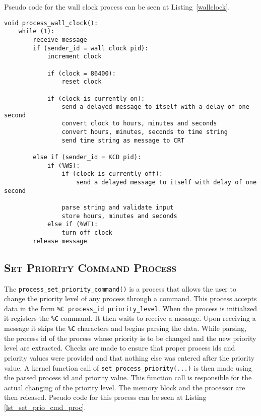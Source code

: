 \documentclass[oneside]{report}
\begin{document}
Pseudo code for the wall clock process can be seen at
Listing~\ref{wallclock}.

\begin{lstlisting}
void process_wall_clock():
    while (1):
        receive message
        if (sender_id = wall clock pid):
            increment clock

            if (clock = 86400):
                reset clock

            if (clock is currently on):
                send a delayed message to itself with a delay of one second
                convert clock to hours, minutes and seconds
                convert hours, minutes, seconds to time string
                send time string as message to CRT

        else if (sender_id = KCD pid):
            if (%WS):
                if (clock is currently off):
                    send a delayed message to itself with delay of one second

                parse string and validate input
                store hours, minutes and seconds
            else if (%WT):
                turn off clock
        release message
\end{lstlisting}

\subsection{\textsc{Set Priority Command Process}}
The \texttt{process\_set\_priority\_command()} is a process that
allows the user to change the priority level of any process through a
command. This process accepts data in the form \texttt{\%C process\_id 
priority\_level}. When the process is initialized it registers the
\texttt{\%C} command. It then waits to receive a message.  Upon receiving a
message it skips the \texttt{\%C} characters and begins parsing the
data. While parsing, the process id of the process whose priority is
to be changed and the new priority level are extracted. Checks are
made to ensure that proper process ids and priority values were
provided and that nothing else was entered after the priority value. A
kernel function call of \texttt{set\_process\_priority(...)} is then
made using the parsed process id and priority value. This function
call is responsible for the actual changing of the priority level. The
memory block and the processor are then released.  Pseudo code for
this process can be seen at Listing \ref{lst_set_prio_cmd_proc}.
\end{document}
